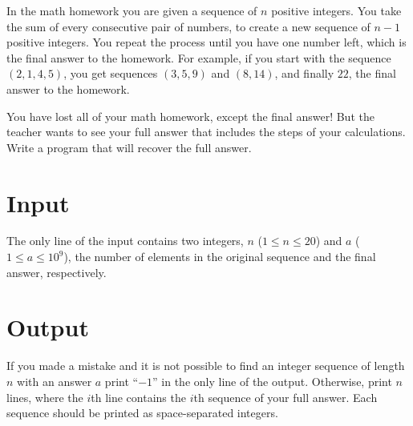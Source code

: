 
In the math homework you are given a sequence of $n$ positive integers.
You take the sum of every consecutive pair of numbers, to create a new sequence of $n - 1$ positive integers.
You repeat the process until you have one number left, which is the final answer to the homework.
For example, if you start with the sequence $(2, 1, 4, 5)$, you get sequences $(3, 5, 9)$ and $(8, 14)$, and finally $22$, the final answer to the homework.

You have lost all of your math homework, except the final answer!
But the teacher wants to see your full answer that includes the steps of your calculations.
Write a program that will recover the full answer.

\section*{Input}
The only line of the input contains two integers, $n$ ($1 \leq n \leq 20$) and $a$ ($1 \leq a \leq 10^9$), the number of elements in the original sequence and the final answer, respectively.

\section*{Output}
If you made a mistake and it is not possible to find an integer sequence of length $n$ with an answer $a$ print ``$-1$'' in the only line of the output.
Otherwise, print $n$ lines, where the $i$th line contains the $i$th sequence of your full answer.
Each sequence should be printed as space-separated integers.
